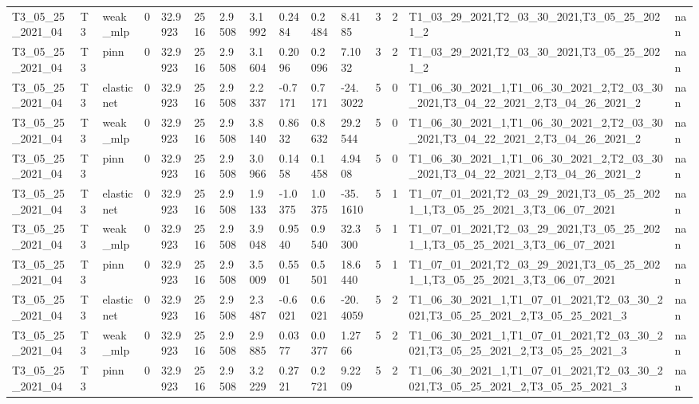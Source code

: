 \begin{table}[t]
\begin{tabular}{lllllllllllllll}
T3\_05\_25\_2021\_04 & T3 & weak\_mlp & 0 & 32.9923 & 2516 & 2.9508 & 3.1992 & 0.2484 & 0.2484 & 8.4185 & 3 & 2 & T1\_03\_29\_2021,T2\_03\_30\_2021,T3\_05\_25\_2021\_2 & nan \\
T3\_05\_25\_2021\_04 & T3 & pinn & 0 & 32.9923 & 2516 & 2.9508 & 3.1604 & 0.2096 & 0.2096 & 7.1032 & 3 & 2 & T1\_03\_29\_2021,T2\_03\_30\_2021,T3\_05\_25\_2021\_2 & nan \\
T3\_05\_25\_2021\_04 & T3 & elasticnet & 0 & 32.9923 & 2516 & 2.9508 & 2.2337 & -0.7171 & 0.7171 & -24.3022 & 5 & 0 & T1\_06\_30\_2021\_1,T1\_06\_30\_2021\_2,T2\_03\_30\_2021,T3\_04\_22\_2021\_2,T3\_04\_26\_2021\_2 & nan \\
T3\_05\_25\_2021\_04 & T3 & weak\_mlp & 0 & 32.9923 & 2516 & 2.9508 & 3.8140 & 0.8632 & 0.8632 & 29.2544 & 5 & 0 & T1\_06\_30\_2021\_1,T1\_06\_30\_2021\_2,T2\_03\_30\_2021,T3\_04\_22\_2021\_2,T3\_04\_26\_2021\_2 & nan \\
T3\_05\_25\_2021\_04 & T3 & pinn & 0 & 32.9923 & 2516 & 2.9508 & 3.0966 & 0.1458 & 0.1458 & 4.9408 & 5 & 0 & T1\_06\_30\_2021\_1,T1\_06\_30\_2021\_2,T2\_03\_30\_2021,T3\_04\_22\_2021\_2,T3\_04\_26\_2021\_2 & nan \\
T3\_05\_25\_2021\_04 & T3 & elasticnet & 0 & 32.9923 & 2516 & 2.9508 & 1.9133 & -1.0375 & 1.0375 & -35.1610 & 5 & 1 & T1\_07\_01\_2021,T2\_03\_29\_2021,T3\_05\_25\_2021\_1,T3\_05\_25\_2021\_3,T3\_06\_07\_2021 & nan \\
T3\_05\_25\_2021\_04 & T3 & weak\_mlp & 0 & 32.9923 & 2516 & 2.9508 & 3.9048 & 0.9540 & 0.9540 & 32.3300 & 5 & 1 & T1\_07\_01\_2021,T2\_03\_29\_2021,T3\_05\_25\_2021\_1,T3\_05\_25\_2021\_3,T3\_06\_07\_2021 & nan \\
T3\_05\_25\_2021\_04 & T3 & pinn & 0 & 32.9923 & 2516 & 2.9508 & 3.5009 & 0.5501 & 0.5501 & 18.6440 & 5 & 1 & T1\_07\_01\_2021,T2\_03\_29\_2021,T3\_05\_25\_2021\_1,T3\_05\_25\_2021\_3,T3\_06\_07\_2021 & nan \\
T3\_05\_25\_2021\_04 & T3 & elasticnet & 0 & 32.9923 & 2516 & 2.9508 & 2.3487 & -0.6021 & 0.6021 & -20.4059 & 5 & 2 & T1\_06\_30\_2021\_1,T1\_07\_01\_2021,T2\_03\_30\_2021,T3\_05\_25\_2021\_2,T3\_05\_25\_2021\_3 & nan \\
T3\_05\_25\_2021\_04 & T3 & weak\_mlp & 0 & 32.9923 & 2516 & 2.9508 & 2.9885 & 0.0377 & 0.0377 & 1.2766 & 5 & 2 & T1\_06\_30\_2021\_1,T1\_07\_01\_2021,T2\_03\_30\_2021,T3\_05\_25\_2021\_2,T3\_05\_25\_2021\_3 & nan \\
T3\_05\_25\_2021\_04 & T3 & pinn & 0 & 32.9923 & 2516 & 2.9508 & 3.2229 & 0.2721 & 0.2721 & 9.2209 & 5 & 2 & T1\_06\_30\_2021\_1,T1\_07\_01\_2021,T2\_03\_30\_2021,T3\_05\_25\_2021\_2,T3\_05\_25\_2021\_3 & nan \\

\end{tabular}
\end{table}
